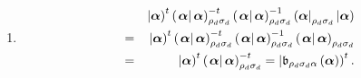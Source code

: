 \documentclass[aps,preprint]{revtex4}
\begin{document}
\begin{enumerate}
\begin{enumerate}
\item 
\begin{eqnarray}
&&\left\vert \boldsymbol{\alpha }\right) ^{t}\left( \left. \boldsymbol{%
\alpha }\right\vert \boldsymbol{\alpha }\right) _{\rho _{d}\sigma
_{d}}^{-t}\left( \left. \boldsymbol{\alpha }\right\vert \boldsymbol{\alpha }%
\right) _{\rho _{d}\sigma _{d}}^{-1}\left( \boldsymbol{\alpha }\right\vert
_{\rho _{d}\sigma _{d}}\left\vert \boldsymbol{\alpha }\right) \\
&=&\left\vert \boldsymbol{\alpha }\right) ^{t}\left( \left. \boldsymbol{%
\alpha }\right\vert \boldsymbol{\alpha }\right) _{\rho _{d}\sigma
_{d}}^{-t}\left( \left. \boldsymbol{\alpha }\right\vert \boldsymbol{\alpha }%
\right) _{\rho _{d}\sigma _{d}}^{-1}\left( \left. \boldsymbol{\alpha }%
\right\vert \boldsymbol{\alpha }\right) _{\rho _{d}\sigma _{d}} \\
&=&\left\vert \boldsymbol{\alpha }\right) ^{t}\left( \left. \boldsymbol{%
\alpha }\right\vert \boldsymbol{\alpha }\right) _{\rho _{d}\sigma
_{d}}^{-t}=\left\vert \mathfrak{b}_{\rho _{d}\sigma _{d}\alpha }\left( 
\boldsymbol{\alpha }\right) \right) ^{t}.
\end{eqnarray}


\end{enumerate}
\end{enumerate}
\end{document}
